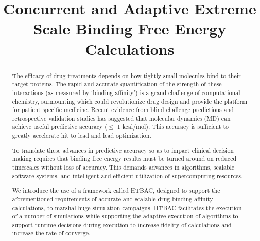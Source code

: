 \documentclass[conference]{IEEEtran}
\begin{document}
\title{Concurrent and Adaptive Extreme Scale Binding Free Energy Calculations}

 \author{
}


\maketitle




\begin{abstract}
The efficacy of drug treatments depends on how tightly small molecules bind to
their target proteins. The rapid and accurate quantification of the strength
of these interactions (as measured by ‘binding affinity’) is a grand challenge
of computational chemistry, surmounting which could revolutionize drug design
and provide the platform for patient specific medicine. Recent evidence from
blind challenge predictions and retrospective validation studies has suggested
that molecular dynamics (MD) can achieve useful predictive accuracy ($\leq$ 1
kcal/mol). This accuracy is sufficient to greatly accelerate hit to lead and
lead optimization.

To translate these advances in predictive accuracy so as to impact clinical
decision making requires that binding free energy results must be turned
around on reduced timescales without loss of accuracy. This demands advances
in algorithms, scalable software systems, and intelligent and efficient
utilization of supercomputing resources.

We introduce the use of a framework called HTBAC, designed to support the
aforementioned requirements of accurate and scalable drug binding affinity
calculations, to marshal huge simulation campaigns.  HTBAC
facilitates the execution of a number of simulations while supporting the
adaptive execution of algorithms to support runtime decisions during execution
to increase fidelity of calculations and increase the rate of converge.
\end{abstract}
\end{document}
